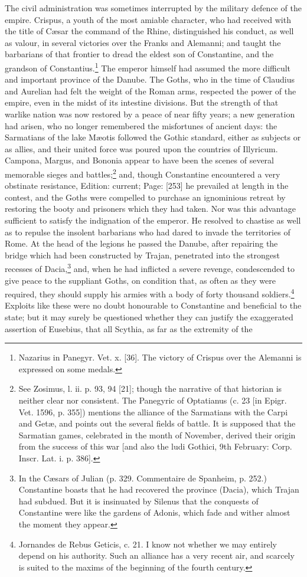 The civil administration was sometimes interrupted by the military defence of the empire. Crispus, a youth of the most amiable character, who had received with the title of Cæsar the command of the Rhine, distinguished his conduct, as well as valour, in several victories over the Franks and Alemanni; and taught the barbarians of that frontier to dread the eldest son of Constantine, and the grandson of Constantius.\footnote{Nazarius in Panegyr. Vet. x. [36]. The victory of Crispus over the Alemanni is expressed on some medals.} The emperor himself had assumed the more difficult and important province of the Danube. The Goths, who in the time of Claudius and Aurelian had felt the weight of the Roman arms, respected the power of the empire, even in the midst of its intestine divisions. But the strength of that warlike nation was now restored by a peace of near fifty years; a new generation had arisen, who no longer remembered the misfortunes of ancient days: the Sarmatians of the lake Mæotis followed the Gothic standard, either as subjects or as allies, and their united force was poured upon the countries of Illyricum. Campona, Margus, and Bononia appear to have been the scenes of several memorable sieges and battles;\footnote{See Zosimus, l. ii. p. 93, 94 [21]; though the narrative of that historian is neither clear nor consistent. The Panegyric of Optatianus (c. 23 [in Epigr. Vet. 1596, p. 355]) mentions the alliance of the Sarmatians with the Carpi and Getæ, and points out the several fields of battle. It is supposed that the Sarmatian games, celebrated in the month of November, derived their origin from the success of this war [and also the ludi Gothici, 9th February: Corp. Inscr. Lat. i. p. 386].} and, though Constantine encountered a very obstinate resistance, Edition: current; Page: [253] he prevailed at length in the contest, and the Goths were compelled to purchase an ignominious retreat by restoring the booty and prisoners which they had taken. Nor was this advantage sufficient to satisfy the indignation of the emperor. He resolved to chastise as well as to repulse the insolent barbarians who had dared to invade the territories of Rome. At the head of the legions he passed the Danube, after repairing the bridge which had been constructed by Trajan, penetrated into the strongest recesses of Dacia,\footnote{In the Cæsars of Julian (p. 329. Commentaire de Spanheim, p. 252.) Constantine boasts that he had recovered the province (Dacia), which Trajan had subdued. But it is insinuated by Silenus that the conquests of Constantine were like the gardens of Adonis, which fade and wither almost the moment they appear.} and, when he had inflicted a severe revenge, condescended to give peace to the suppliant Goths, on condition that, as often as they were required, they should supply his armies with a body of forty thousand soldiers.\footnote{Jornandes de Rebus Geticis, c. 21. I know not whether we may entirely depend on his authority. Such an alliance has a very recent air, and scarcely is suited to the maxims of the beginning of the fourth century.} Exploits like these were no doubt honourable to Constantine and beneficial to the state; but it may surely be questioned whether they can justify the exaggerated assertion of Eusebius, that all Scythia, as far as the extremity of the 